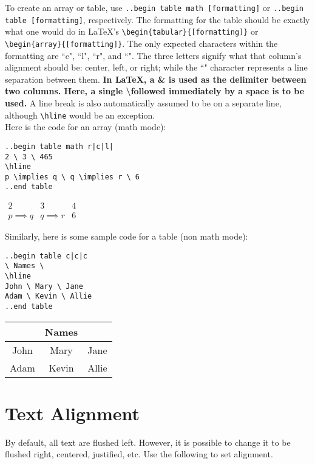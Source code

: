 \documentclass[12pt]{article}
\newcommand{\nl}{\\}
\renewcommand\bold{\textbf}
\begin{document}
\begin{flushleft}
To create an array or table, use \verb|..begin table math [formatting]| or \verb|..begin table [formatting]|, respectively. The formatting for the table should be exactly what one would do in LaTeX's \verb|\begin{tabular}{[formatting]}| or \verb|\begin{array}{[formatting]}|. The only expected characters within the formatting are ``c", ``l", ``r", and ``\textbar". The three letters signify what that column's alignment should be: center, left, or right; while the ``\textbar" character represents a line separation between them. \bold{In LaTeX, a \& is used as the delimiter between two columns. Here, a single \textbackslash followed immediately by a space is to be used.} A line break is also automatically assumed to be on a separate line, although \verb|\hline| would be an exception. \nl
\medskip
Here is the code for an array (math mode): \nl
\medskip

\verb=..begin table math r|c|l|= \nl
\verb|2 \ 3 \ 465| \nl
\verb|\hline| \nl
\verb|p |\verb|\implies q \ q \implies r \ 6| \nl
\verb|..end table|

\bigskip

$\begin{array}{r|c|l|}
2 & 3 & 4 \\
\hline
p \implies q & q \implies r & 6 
\end{array}$

\bigskip

Similarly, here is some sample code for a table (non math mode): \nl
\medskip

\verb=..begin table c|c|c= \nl
\verb|\ Names \| \nl
\verb|\hline| \nl
\verb|John \ Mary \ Jane| \nl
\verb|Adam \ Kevin \ Allie| \nl
\verb|..end table|

\bigskip

\begin{tabular}{c|c|c}
& Names & \\
\hline
John & Mary & Jane \\
Adam & Kevin & Allie 
\end{tabular}

\newpage

\section*{Text Alignment}

By default, all text are flushed left. However, it is possible to change it to be flushed right, centered, justified, etc. Use the following to set alignment.

\end{flushleft}
\end{document}
